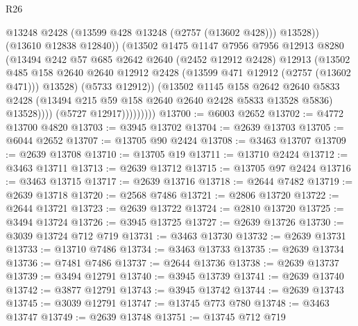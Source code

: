 \begin{lexlean}{R26}
\begin{coremodule}
                              @13248
                              @2428
                              (@13599 @428 @13248 (@2757 (@13602 @428)))
                              @13528))
                          (@13610 @12838 @12840))
                        (@13502
                          @1475
                          @1147
                          @7956
                          @7956
                          @12913
                          @8280
                          (@13494
                            @242
                            @57
                            @685
                            @2642
                            @2640
                            (@2452 @12912 @2428)
                            @12913
                            (@13502
                              @485
                              @158
                              @2640
                              @2640
                              @12912
                              @2428
                              (@13599 @471 @12912 (@2757 (@13602 @471)))
                              @13528)
                            (@5733 @12912))
                          (@13502
                            @1145
                            @158
                            @2642
                            @2640
                            @5833
                            @2428
                            (@13494 @215 @59 @158 @2640 @2640 @2428 @5833 @13528 @5836)
                            @13528))))
                    (@5727 @12917)))))))))
@13700 := @6003 @2652
@13702 := @4772 @13700 @4820
@13703 := @3945 @13702
@13704 := @2639 @13703
@13705 := @6044 @2652
@13707 := @13705 @90 @2424
@13708 := @3463 @13707
@13709 := @2639 @13708
@13710 := @13705 @19
@13711 := @13710 @2424
@13712 := @3463 @13711
@13713 := @2639 @13712
@13715 := @13705 @97 @2424
@13716 := @3463 @13715
@13717 := @2639 @13716
@13718 := @2644 @7482
@13719 := @2639 @13718
@13720 := @2568 @7486
@13721 := @2806 @13720
@13722 := @2644 @13721
@13723 := @2639 @13722
@13724 := @2810 @13720
@13725 := @3494 @13724
@13726 := @3945 @13725
@13727 := @2639 @13726
@13730 := @3039 @13724 @712 @719
@13731 := @3463 @13730
@13732 := @2639 @13731
@13733 := @13710 @7486
@13734 := @3463 @13733
@13735 := @2639 @13734
@13736 := @7481 @7486
@13737 := @2644 @13736
@13738 := @2639 @13737
@13739 := @3494 @12791
@13740 := @3945 @13739
@13741 := @2639 @13740
@13742 := @3877 @12791
@13743 := @3945 @13742
@13744 := @2639 @13743
@13745 := @3039 @12791
@13747 := @13745 @773 @780
@13748 := @3463 @13747
@13749 := @2639 @13748
@13751 := @13745 @712 @719

\end{coremodule}
\end{lexlean}
